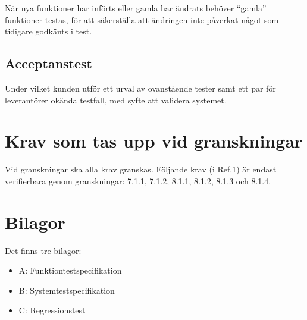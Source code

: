 \documentclass[a4paper]{article}
\begin{document}
När nya funktioner har införts eller gamla har ändrats behöver ``gamla'' funktioner testas, för att säkerställa att ändringen inte påverkat något som tidigare godkänts i test.

\subsection{Acceptanstest}

Under vilket kunden utför ett urval av ovanstående tester samt ett par för leverantörer okända testfall, med syfte att validera systemet.

\section{Krav som tas upp vid granskningar}

Vid granskningar ska alla krav granskas.
Följande krav (i Ref.1) är endast verifierbara genom granskningar: 7.1.1, 7.1.2, 8.1.1, 8.1.2, 8.1.3 och 8.1.4.

\section{Bilagor}

Det finns tre bilagor:

\begin{itemize}
\item A: Funktiontestspecifikation
\item B: Systemtestspecifikation
\item C: Regressionstest

\end{itemize}

\newpage
\end{document}
